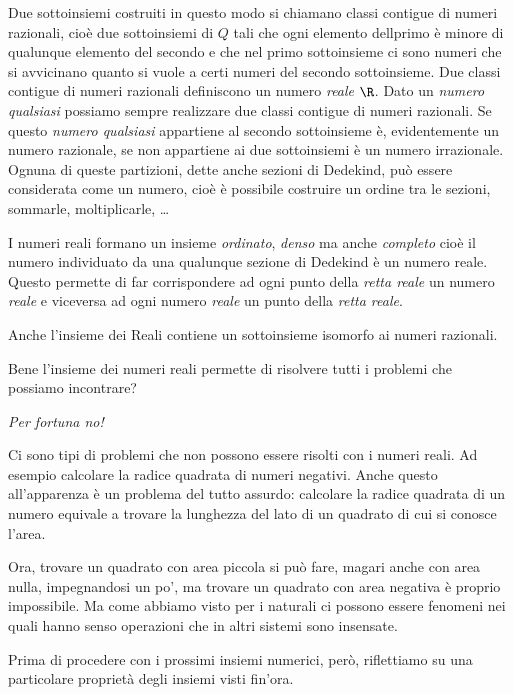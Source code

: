 Due sottoinsiemi costruiti in questo modo si chiamano classi contigue di 
numeri razionali, cioè due sottoinsiemi di \(Q\) tali che ogni elemento 
dellprimo è minore di qualunque elemento del secondo e che nel primo 
sottoinsieme ci sono numeri che si avvicinano quanto si vuole a certi 
numeri del secondo sottoinsieme.
Due classi contigue di numeri razionali definiscono un 
numero \emph{reale} \(\R\). Dato un \emph{numero qualsiasi} possiamo sempre 
realizzare due classi contigue di numeri razionali. 
Se questo \emph{numero qualsiasi} appartiene al secondo sottoinsieme è, 
evidentemente un numero razionale, se non appartiene ai due sottoinsiemi è 
un numero irrazionale. 
Ognuna di queste partizioni, dette anche sezioni di Dedekind, può essere 
considerata come un numero, cioè è possibile costruire un ordine tra le 
sezioni, sommarle, moltiplicarle, \dots

I numeri reali formano un insieme \emph{ordinato}, \emph{denso} ma anche 
\emph{completo} cioè il numero individuato da una qualunque sezione di 
Dedekind è un numero reale.
Questo permette di far corrispondere ad ogni punto della \emph{retta reale} 
un numero \emph{reale} e viceversa ad ogni numero \emph{reale} un punto 
della \emph{retta reale}. 

Anche l'insieme dei Reali contiene un sottoinsieme isomorfo ai numeri 
razionali.

Bene l'insieme dei numeri reali permette di risolvere tutti i problemi che 
possiamo incontrare?
\vspace{-1em}
\begin{center} \emph{Per fortuna no!} \end{center}
\vspace{-.5em}
Ci sono tipi di problemi che non possono essere risolti con i numeri reali.
Ad esempio calcolare la radice quadrata di numeri negativi. 
Anche questo all'apparenza è un problema del tutto assurdo: calcolare la 
radice quadrata di un numero equivale a trovare la lunghezza del lato di un 
quadrato di cui si conosce l'area. 

Ora, trovare un quadrato con area piccola si può fare, magari anche con 
area nulla, impegnandosi un po', ma trovare un quadrato con area negativa 
è proprio impossibile. 
Ma come abbiamo visto per i naturali ci possono essere fenomeni nei quali 
hanno senso operazioni che in altri sistemi sono insensate.

Prima di procedere con i prossimi insiemi numerici, però, riflettiamo su 
una particolare proprietà degli insiemi visti fin'ora.

